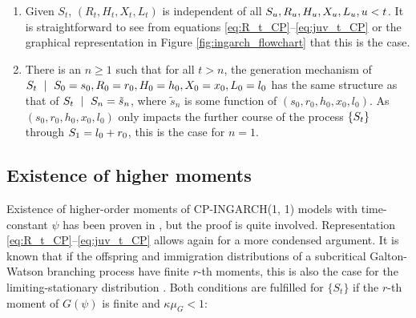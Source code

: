 \documentclass[review]{elsarticle}
\begin{document}
\begin{enumerate}
\item Given $S_t$, $(R_t, H_t, X_t, L_t)$ is independent of all $S_u, R_u, H_u, X_u, L_u, u < t$. It is straightforward to see from equations \eqref{eq:R_t_CP}--\eqref{eq:juv_t_CP} or the graphical representation in Figure \ref{fig:ingarch_flowchart} that this is the case.
\item There is an $n \geq 1$ such that for all $t > n$, the generation mechanism of $\juv_t \ \mid \ \juv_0 = s_0, R_0 = r_0, H_0 = h_0, X_0 = x_0, L_0 = l_0$ has the same structure as that of $\juv_t \ \mid \ \juv_n = \tilde{s}_n$, where $\tilde{s}_n$ is some function of $(s_0, r_0, h_0, x_0, l_0)$. As $(s_0, r_0, h_0, x_0, l_0)$ only impacts the further course of the process $\{S_t\}$ through $S_1 = l_0 + r_0$, this is the case for $n = 1$. %
\end{enumerate}

\subsection{Existence of higher moments}

Existence of higher-order moments of CP-INGARCH(1, 1) models with time-constant $\psi$ has been proven in \cite{Silva2016}, but the proof is quite involved. Representation \eqref{eq:R_t_CP}--\eqref{eq:juv_t_CP} allows again for a more condensed argument. It is known that if the offspring and immigration distributions of a subcritical Galton-Watson branching process have finite $r$-th moments, this is also the case for the limiting-stationary distribution \cite[Sec. 4]{Lange1981}. Both conditions are fulfilled for $\{S_t\}$ if the $r$-th moment of $G(\psi)$ is finite and $\kappa\mu_G < 1$:
\end{document}
